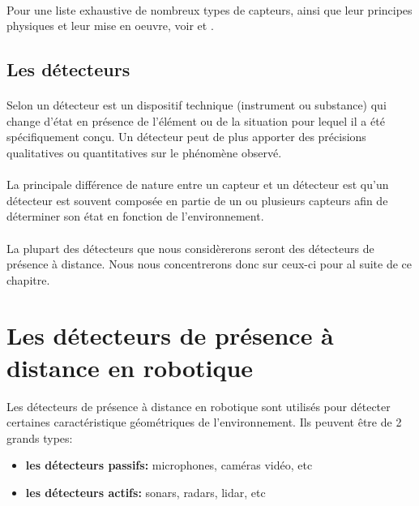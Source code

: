 \documentclass[12pt,a4paper]{report}
\begin{document}
\paragraph{} Pour une liste exhaustive de nombreux types de capteurs, ainsi que leur principes physiques et leur mise en oeuvre, voir \cite{asch_les_2010} et \cite{fraden_handbook_2004}.

\subsection{Les détecteurs}

\paragraph{} Selon \cite{noauthor_detection_2017} un détecteur est un dispositif technique (instrument ou substance) qui change d'état en présence de l'élément ou de la situation pour lequel il a été spécifiquement conçu. Un détecteur peut de plus apporter des précisions qualitatives ou quantitatives sur le phénomène observé.

\paragraph{} La principale différence de nature entre un capteur et un détecteur est qu'un détecteur est souvent composée en partie de un ou plusieurs capteurs afin de déterminer son état en fonction de l'environnement.

\paragraph{} La plupart des détecteurs que nous considèrerons seront des détecteurs de présence à distance. Nous nous concentrerons donc sur ceux-ci pour al suite de ce chapitre.

\section{Les détecteurs de présence à distance en robotique}
Les détecteurs de présence à distance en robotique sont utilisés pour détecter certaines caractéristique géométriques de l'environnement. Ils peuvent être de 2 grands types:
\begin{itemize}
	\item \textbf{les détecteurs passifs:} microphones, caméras vidéo, etc
	\item \textbf{les détecteurs actifs:} sonars, radars, lidar, etc
\end{itemize}
\end{document}
